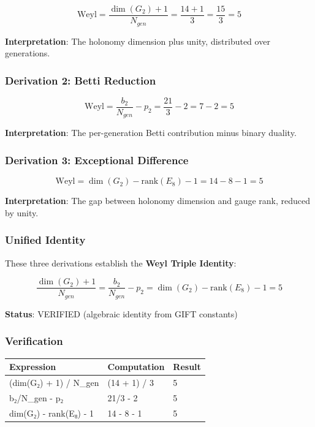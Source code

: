 \documentclass[11pt,a4paper]{article}
\begin{document}
{{{{\[\text{Weyl} = \frac{\dim(G_2) + 1}{N_{gen}} = \frac{14 + 1}{3} = \frac{15}{3} = 5\]

\textbf{Interpretation}: The holonomy dimension plus unity, distributed over generations.

\subsubsection{Derivation 2: Betti Reduction}\label{derivation-2-betti-reduction}

\[\text{Weyl} = \frac{b_2}{N_{gen}} - p_2 = \frac{21}{3} - 2 = 7 - 2 = 5\]

\textbf{Interpretation}: The per-generation Betti contribution minus binary duality.

\subsubsection{Derivation 3: Exceptional Difference}\label{derivation-3-exceptional-difference}

\[\text{Weyl} = \dim(G_2) - \text{rank}(E_8) - 1 = 14 - 8 - 1 = 5\]

\textbf{Interpretation}: The gap between holonomy dimension and gauge rank, reduced by unity.

\subsubsection{Unified Identity}\label{unified-identity}

These three derivations establish the \textbf{Weyl Triple Identity}:

\[\boxed{\frac{\dim(G_2) + 1}{N_{gen}} = \frac{b_2}{N_{gen}} - p_2 = \dim(G_2) - \text{rank}(E_8) - 1 = 5}\]

\textbf{Status}: VERIFIED (algebraic identity from GIFT constants)

\subsubsection{Verification}\label{verification}

{\def\LTcaptype{none} %
\begin{longtable}[]{@{}lll@{}}
\toprule\noalign{}
Expression & Computation & Result \\
\midrule\noalign{}
\endhead
\bottomrule\noalign{}
\endlastfoot
(dim(G₂) + 1) / N\_gen & (14 + 1) / 3 & 5 \\
b₂/N\_gen - p₂ & 21/3 - 2 & 5 \\
dim(G₂) - rank(E₈) - 1 & 14 - 8 - 1 & 5 \\
\end{longtable}
}}}}}
\end{document}
